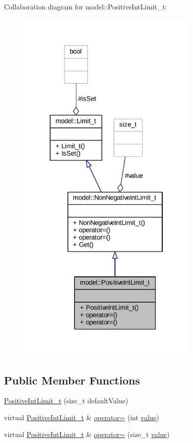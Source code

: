 Collaboration diagram for model\+:\+:Positive\+Int\+Limit\+\_\+t\+:
\nopagebreak
\begin{figure}[H]
\begin{center}
\leavevmode
\includegraphics[width=250pt]{structmodel_1_1_positive_int_limit__t__coll__graph}
\end{center}
\end{figure}
\subsection*{Public Member Functions}
\begin{DoxyCompactItemize}
\item 
\hyperlink{structmodel_1_1_positive_int_limit__t_a8242be57438e3463979e5fda94aeba94}{Positive\+Int\+Limit\+\_\+t} (size\+\_\+t default\+Value)
\item 
virtual \hyperlink{structmodel_1_1_positive_int_limit__t}{Positive\+Int\+Limit\+\_\+t} \& \hyperlink{structmodel_1_1_positive_int_limit__t_a19a412c91048d044d7cada523e11238d}{operator=} (int \hyperlink{classmodel_1_1_non_negative_int_limit__t_aca4f56e8c716086b2bfc9c54dbd22ee7}{value})
\item 
virtual \hyperlink{structmodel_1_1_positive_int_limit__t}{Positive\+Int\+Limit\+\_\+t} \& \hyperlink{structmodel_1_1_positive_int_limit__t_a1cc617b2848ff423d27d0159179ac393}{operator=} (size\+\_\+t \hyperlink{classmodel_1_1_non_negative_int_limit__t_aca4f56e8c716086b2bfc9c54dbd22ee7}{value})
\end{DoxyCompactItemize}
